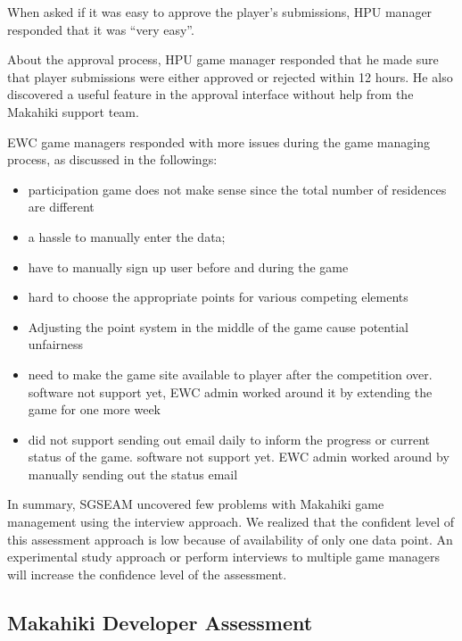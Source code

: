 When asked if it was easy to approve the player's submissions, HPU manager responded that it was ``very easy''. 

About the approval process, HPU game manager responded that he made sure that player submissions were either approved or rejected
within 12 hours. He also discovered a useful feature in the approval interface without
help from the Makahiki support team. 

EWC game managers responded with more issues during the game managing process, as discussed in the followings:
\begin{itemize}
\item participation game does not make sense since the total number of residences are different

\item a hassle to manually enter the data;

\item have to manually sign up user before and during the game

\item hard to choose the appropriate points for various competing elements

\item Adjusting the point system in the middle of the game cause potential unfairness

\item need to make the game site available to player after the competition over. software not support yet, EWC admin worked around it by extending the game for one more week

\item did not support sending out email daily to inform the progress or current status of the game.  software not support yet. EWC admin worked around by manually sending out the status email
\end{itemize}

In summary, SGSEAM uncovered few problems with Makahiki game management using the interview
approach. We realized that the confident level of this assessment approach is low because of
 availability of only one data point. An experimental study approach or perform interviews to
multiple game managers will increase the confidence level of the assessment.

\subsection{Makahiki Developer Assessment}

